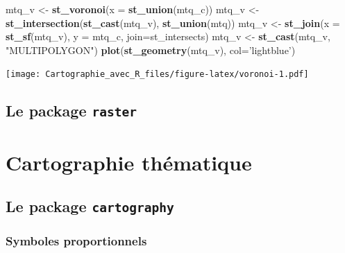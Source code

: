 \documentclass[]{book}
\newenvironment{Shaded}{\begin{snugshade}}{\end{snugshade}}
\newcommand{\DataTypeTok}[1]{\textcolor[rgb]{0.13,0.29,0.53}{#1}}
\newcommand{\KeywordTok}[1]{\textcolor[rgb]{0.13,0.29,0.53}{\textbf{#1}}}
\newcommand{\NormalTok}[1]{#1}
\newcommand{\StringTok}[1]{\textcolor[rgb]{0.31,0.60,0.02}{#1}}
\begin{document}
\begin{Shaded}
\begin{Highlighting}[]
\NormalTok{mtq_v <-}\StringTok{ }\KeywordTok{st_voronoi}\NormalTok{(}\DataTypeTok{x =} \KeywordTok{st_union}\NormalTok{(mtq_c))}
\NormalTok{mtq_v <-}\StringTok{ }\KeywordTok{st_intersection}\NormalTok{(}\KeywordTok{st_cast}\NormalTok{(mtq_v), }\KeywordTok{st_union}\NormalTok{(mtq))}
\NormalTok{mtq_v <-}\StringTok{ }\KeywordTok{st_join}\NormalTok{(}\DataTypeTok{x =} \KeywordTok{st_sf}\NormalTok{(mtq_v), }\DataTypeTok{y =}\NormalTok{ mtq_c, }\DataTypeTok{join=}\NormalTok{st_intersects)}
\NormalTok{mtq_v <-}\StringTok{ }\KeywordTok{st_cast}\NormalTok{(mtq_v, }\StringTok{"MULTIPOLYGON"}\NormalTok{)}
\KeywordTok{plot}\NormalTok{(}\KeywordTok{st_geometry}\NormalTok{(mtq_v), }\DataTypeTok{col=}\StringTok{'lightblue'}\NormalTok{)}
\end{Highlighting}
\end{Shaded}

\texttt{[image: Cartographie\_avec\_R\_files/figure-latex/voronoi-1.pdf]}

\hypertarget{le-package-raster}{%
\section{\texorpdfstring{Le package \texttt{raster}}{Le package raster}}\label{le-package-raster}}

\hypertarget{jour2}{%
\chapter{Cartographie thématique}\label{jour2}}

\hypertarget{le-package-cartography}{%
\section{\texorpdfstring{Le package \texttt{cartography}}{Le package cartography}}\label{le-package-cartography}}

\hypertarget{symboles-proportionnels}{%
\subsection{Symboles proportionnels}\label{symboles-proportionnels}}
\end{document}
